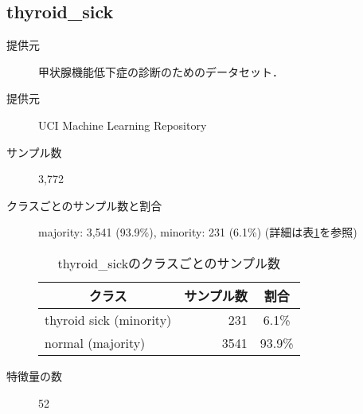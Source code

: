 \subsection{thyroid\_sick}
\begin{description}
    \item[提供元] 甲状腺機能低下症の診断のためのデータセット．\cite{thyroid}
    \item[提供元] UCI Machine Learning Repository
    \item[サンプル数] 3,772
    \item[クラスごとのサンプル数と割合] majority: 3,541 (93.9\%), minority: 231 (6.1\%) (詳細は表\ref{tab:thyroid_sick}を参照)
        \begin{table}[htbp]
            \centering
            \caption{thyroid\_sickのクラスごとのサンプル数}
            \label{tab:thyroid_sick}
            \begin{tabular}{lrc} \hline
                \multicolumn{1}{c}{クラス}&
                \multicolumn{1}{c}{サンプル数}&
                \multicolumn{1}{c}{割合}\\
                \hline
                \hline
                thyroid sick (minority)& 231 & 6.1\% \\
                normal (majority)& 3541 & 93.9\% \\
                \hline
            \end{tabular}
        \end{table}

    \item[特徴量の数] 52
\end{description}

